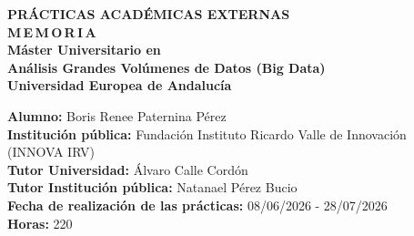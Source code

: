 \begin{titlepage}
\thispagestyle{portada}
\begin{center}

\vspace*{1.5cm}
{\Large\bfseries PRÁCTICAS ACADÉMICAS EXTERNAS}\\[0.8cm]

{\Large\bfseries M\,E\,M\,O\,R\,I\,A}\\[1.2cm]

{\large\bfseries Máster Universitario en}\\[0.2cm]
{\large\bfseries Análisis Grandes Volúmenes de Datos (Big Data)}\\[0.3cm]
{\large\bfseries Universidad Europea de Andalucía}\\[2.5cm]

\begin{flushleft}
\normalsize
\textbf{Alumno:} Boris Renee Paternina Pérez\\[0.8cm]
\textbf{Institución pública:} Fundación Instituto Ricardo Valle de Innovación (INNOVA IRV)\\[0.8cm]
\textbf{Tutor Universidad:} Álvaro Calle Cordón\\[0.8cm]
\textbf{Tutor Institución pública:} Natanael Pérez Bucio\\[0.8cm]
\textbf{Fecha de realización de las prácticas:} 08/06/2026 - 28/07/2026\\[0.8cm]
\textbf{Horas:} 220
\end{flushleft}

\vfill
\end{center}
\end{titlepage}
